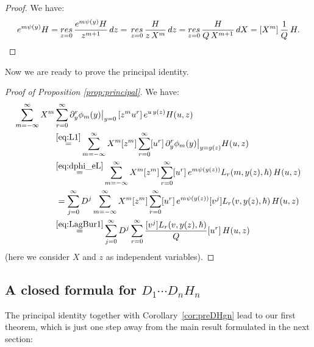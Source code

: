 \documentclass[11pt]{article}
\theoremstyle{plain}
\theoremstyle{definition}
\theoremstyle{remark}
\newcommand{\res}{\mathop{\rm res}}
\begin{document}
\begin{proof} We have:
\begin{equation*}
[z^m] e^{m\psi(y)} H =
\res_{z=0} \frac{e^{m\psi(y)} H}{z^{m+1}}\,dz=\\
\res_{z=0} \frac{H}{z\,X^{m}}\,dz=
\res_{z=0} \frac{H}{Q\,X^{m+1}}\,dX= [X^m] \,\frac{1}{Q}\,H.\qedhere
\end{equation*}
\end{proof}

Now we are ready to prove the principal identity.

\begin{proof}[Proof of Proposition \ref{prop:principal}] We have:
\begin{align*}
\sum_{m=-\infty}^\infty X^{m}&\sum_{r=0}^\infty
\partial_y^{r}\phi_{m}(y)\big|_{y=0}\,[z^mu^r]\,
e^{u\,y(z)}H(u,z)
\\
&\mathop{=}^{\eqref{eq:L1}}
\sum_{m=-\infty}^\infty X^m[z^m]\sum_{r=0}^\infty [u^r]\,\partial_y^r\phi_m(y)\big|_{y=y(z)}H(u,z)
\\
&\mathop{=}^{\eqref{eq:dphi_eL}}\sum_{m=-\infty}^\infty X^m[z^m]\sum_{r=0}^\infty [u^r]\,
e^{m \psi(y(z))}L_r(m,y(z),\hbar)\,H(u,z)
\\
&\,=\sum_{j=0}^\infty D^j\sum_{m=-\infty}^\infty X^m[z^m]\sum_{r=0}^\infty [u^r]\,
e^{m \psi(y(z))}[v^j]L_r(v,y(z),\hbar)\,H(u,z)
\\
&\mathop{=}^{\eqref{eq:LagBur1}}\sum_{j=0}^\infty D^j\sum_{r=0}^\infty
\frac{[v^j]L_r(v,y(z),\hbar)}{Q}[u^r]\,H(u,z)
\end{align*}
(here we consider $X$ and $z$ as independent variables).
\end{proof}

\subsection{A closed formula for \texorpdfstring{$D_1\cdots D_n H_n$}{D1...DnHn}}

The principal identity together with Corollary~\ref{cor:preDHgn} lead to our first theorem, which is just one step away from the main result formulated in the next section:
\end{document}
